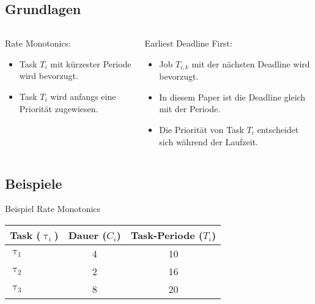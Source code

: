 \subsection{Grundlagen}
\begin{frame}{\subsecname}
		\begin{columns}[]
  			\begin{column}{0.5\textwidth}
				Rate Monotonics:
				\begin{itemize}
					\item Task $T_i$ mit kürzester Periode wird bevorzugt.
					\item Task $T_i$ wird anfangs eine Priorität zugewiesen.
				\end{itemize}

			\end{column}
  			\begin{column}{0.5\textwidth}
  				Earliest Deadline First:
				\begin{itemize}
					\item Job $T_{i, k}$ mit der nächsten Deadline wird bevorzugt.
					\item In diesem Paper ist die Deadline gleich mit der Periode.
					\item Die Priorität von Task $T_i$ entscheidet sich während der Laufzeit.
				\end{itemize}	
  			\end{column}
		\end{columns}
\end{frame}

\subsection{Beispiele}

\newcommand{\showRMSlide}[1] {\begin{frame}{Beispiel Rate Monotonics}
	\begin{center}
		\begin{tabular}{l||c|c}
				Task ($\uptau_i$) & Dauer ($C_i$) & Task-Periode ($T_i$)\\\hline\hline
				$\uptau_1$ & 4 & 10\\
				$\uptau_2$ & 2 & 16\\
				$\uptau_3$ & 8 & 20\\
		\end{tabular}
	\end{center}
	
\end{frame}}

%
{%
	\showRMSlide{\arabic{ct}}
}

